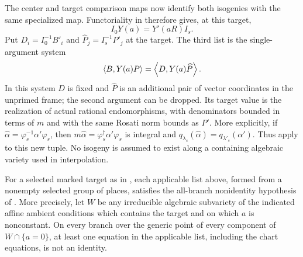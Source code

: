 The center and target comparison maps now identify both isogenies with
the same specialized map.  Functoriality in
 therefore gives, at this target,
\begin{equation}\label{eq:isogeny-transport}
 I_0Y(a)=Y'(aR)I_s.
\end{equation}
Put $D_i=I_0^{-1}B'_i$ and $\widehat P_j=I_s^{-1}P'_j$ at the target.
The third list is the single-argument system
\begin{equation}\label{eq:exceptional-system}
 \left\langle B,Y(a)P\right\rangle=\left\langle D,Y(a)\widehat P\right\rangle.
\end{equation}
In this system $D$ is fixed and $\widehat P$ is an additional pair of
vector coordinates in the unprimed frame; the second argument can be
dropped.  Its target value is the realization of actual rational
endomorphisms, with denominators bounded in terms of $m$ and with the same
Rosati norm bounds as $P'$.  More explicitly, if
$\widehat\alpha=\varphi_s^{-1}\alpha'\varphi_s$, then
$m\widehat\alpha=\varphi_s^\dagger\alpha'\varphi_s$ is integral and
$q_{\lambda_s}(\widehat\alpha)=q_{\lambda'_s}(\alpha')$.
Thus 
apply to this new tuple.  No isogeny is assumed to exist along a containing
algebraic variety used in interpolation.

\begin{proposition}\label{prop:nonidentity}
For a selected marked target as in , each applicable
list above, formed from a nonempty selected group of places, satisfies
the all-branch nonidentity hypothesis of
.  More precisely, let $W$ be any irreducible
algebraic subvariety of the indicated affine ambient conditions which
contains the target and on which $a$ is nonconstant.  On every branch
over the generic point of every component of $W\cap\{a=0\}$, at least
one equation in the applicable list, including the chart equations,
is not an identity.
\end{proposition}


